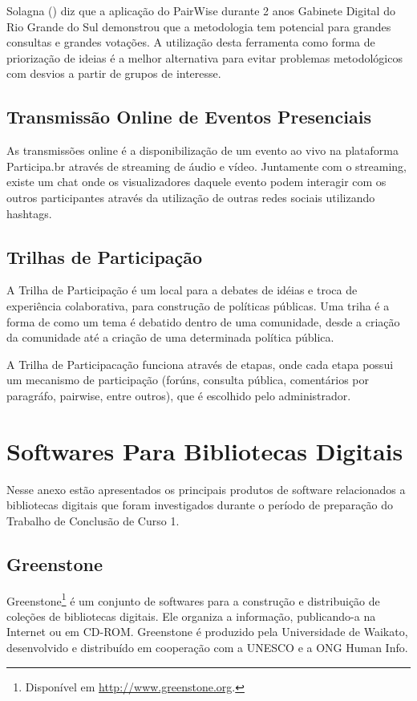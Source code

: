 Solagna (\citeyear{solagna2014metodologias}) diz que a aplicação do PairWise durante 2 anos Gabinete Digital do Rio Grande do Sul demonstrou que a metodologia tem potencial para grandes consultas e grandes votações. A utilização desta ferramenta como forma de priorização de ideias é a melhor alternativa para evitar problemas metodológicos com desvios a partir de grupos de interesse.

\subsection*{Transmissão Online de Eventos Presenciais}

As transmissões online é a disponibilização de um evento ao vivo na plataforma Participa.br através de streaming de áudio e vídeo. Juntamente com o streaming, existe um chat onde os visualizadores daquele evento podem interagir com os outros participantes através da utilização de outras redes sociais utilizando hashtags.

\subsection*{Trilhas de Participação}

A Trilha de Participação é um local para a debates de idéias e troca de experiência colaborativa, para construção de políticas públicas. Uma triha é a forma de como um tema é debatido dentro de uma comunidade, desde a criação da comunidade até a criação de uma determinada política pública.

A Trilha de Participacação funciona através de etapas, onde cada etapa possui um mecanismo de participação (forúns, consulta pública, comentários por paragráfo, pairwise, entre outros), que é escolhido pelo administrador. 

\newpage
\section{Softwares Para Bibliotecas Digitais}
\label{Att:anexobibliotecas}

Nesse anexo estão apresentados os principais produtos de software relacionados a bibliotecas digitais que foram investigados durante o período de preparação do Trabalho de Conclusão de Curso 1.

\subsection*{Greenstone} 
Greenstone\footnote{Disponível em \url{http://www.greenstone.org}.} é um conjunto de softwares para a construção e distribuição de coleções de bibliotecas digitais. Ele organiza a informação, publicando-a na Internet ou em CD-ROM. Greenstone é produzido pela Universidade de Waikato, desenvolvido e distribuído em cooperação com a UNESCO e a ONG Human Info.

